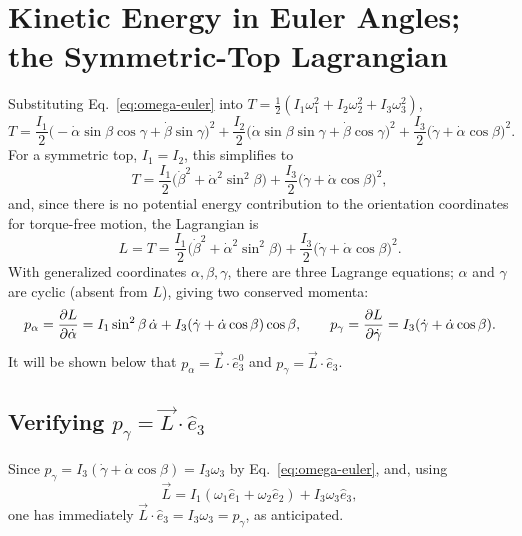 \documentclass[11pt]{article}
\begin{document}
\section{Kinetic Energy in Euler Angles; the Symmetric-Top Lagrangian}

Substituting Eq.~\eqref{eq:omega-euler} into $T=\frac12(I_1\omega_1^2+I_2\omega_2^2+I_3\omega_3^2)$,
\begin{equation}
T = \frac{I_1}{2}\big(-\dot\alpha\sin\beta\cos\gamma+\dot\beta\sin\gamma\big)^2 + \frac{I_2}{2}\big(\dot\alpha\sin\beta\sin\gamma+\dot\beta\cos\gamma\big)^2 + \frac{I_3}{2}\big(\dot\gamma+\dot\alpha\cos\beta\big)^2.
\label{eq:T-euler-general}
\end{equation}
For a symmetric top, $I_1=I_2$, this simplifies to
\begin{equation}
T = \frac{I_1}{2}\big(\dot\beta^2+\dot\alpha^2\sin^2\beta\big)+\frac{I_3}{2}\big(\dot\gamma+\dot\alpha\cos\beta\big)^2,
\label{eq:T-symtop}
\end{equation}
and, since there is no potential energy contribution to the orientation coordinates for torque-free motion, the Lagrangian is
\begin{equation}
L = T = \frac{I_1}{2}\big(\dot\beta^2+\dot\alpha^2\sin^2\beta\big)+\frac{I_3}{2}\big(\dot\gamma+\dot\alpha\cos\beta\big)^2.
\label{eq:L-symtop}
\end{equation}
With generalized coordinates $\alpha,\beta,\gamma$, there are three Lagrange equations; $\alpha$ and $\gamma$ are cyclic (absent from $L$), giving two conserved momenta:
\begin{equation}
p_\alpha = \frac{\partial L}{\partial \dot\alpha} = I_1\sin^2\beta\,\dot\alpha + I_3(\dot\gamma+\dot\alpha\cos\beta)\cos\beta, \qquad
p_\gamma = \frac{\partial L}{\partial \dot\gamma} = I_3(\dot\gamma+\dot\alpha\cos\beta).
\label{eq:p-alpha-gamma}
\end{equation}
It will be shown below that $p_\alpha=\vec L\cdot\hat e_3^0$ and $p_\gamma=\vec L\cdot\hat e_3$.

\subsection{\texorpdfstring{Verifying $p_\gamma=\vec L\cdot\hat e_3$}{Verifying p\_gamma = L . e3}}

Since $p_\gamma=I_3(\dot\gamma+\dot\alpha\cos\beta)=I_3\omega_3$ by Eq.~\eqref{eq:omega-euler}, and, using
\begin{equation}
\vec L = I_1(\omega_1\hat e_1+\omega_2\hat e_2)+I_3\omega_3\hat e_3,
\label{eq:L-symtop-vec}
\end{equation}
one has immediately $\vec L\cdot\hat e_3=I_3\omega_3=p_\gamma$, as anticipated.
\end{document}
